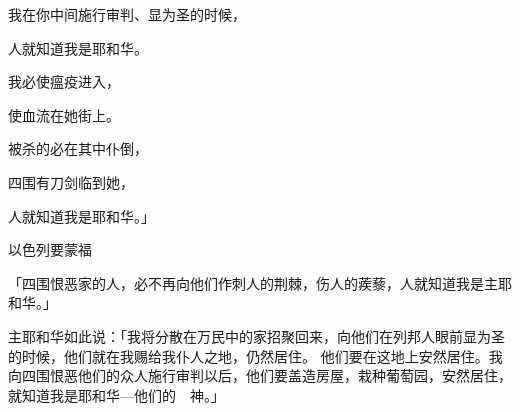 {\par }{\Q 我在你中间施行审判、显为圣的时候，
\par }{\Q 人就知道我是耶和华。
\par }{\Q {}我必使瘟疫进入{}，
\par }{\Q 使血流在她街上。
\par }{\Q 被杀的必在其中仆倒，
\par }{\Q 四围有刀剑临到她，
\par }{\Q 人就知道我是耶和华。」
\par }{\SH 以色列要蒙福
\par }{\PP {}「四围恨恶{}家的人，必不再向他们作刺人的荆棘，伤人的蒺藜，人就知道我是主耶和华。」
\par }{\PP {}主耶和华如此说：「我将分散在万民中的{}家招聚回来，向他们在列邦人眼前显为圣的时候，他们就在我赐给我仆人{}之地，仍然居住。
他们要在这地上安然居住。我向四围恨恶他们的众人施行审判以后，他们要盖造房屋，栽种葡萄园，安然居住，就知道我是耶和华—他们的　神。」

}
